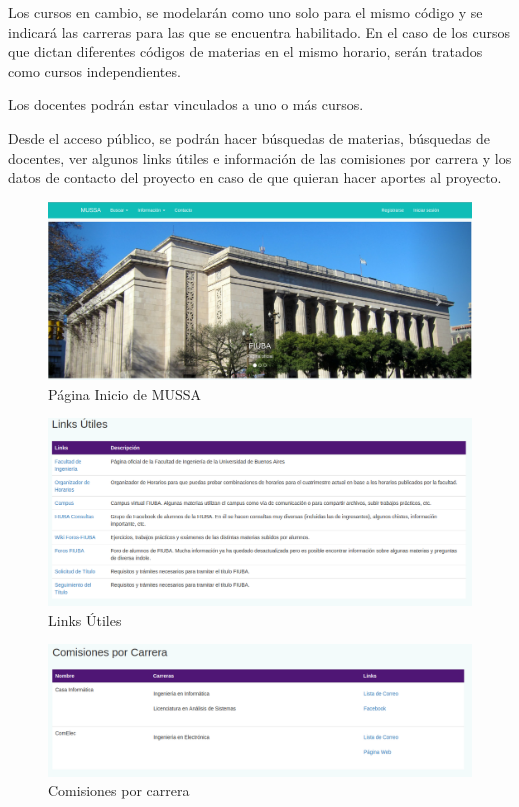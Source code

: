 \documentclass[a4paper]{article}
\begin{document}
Los cursos en cambio, se modelarán como uno solo para el mismo código y se indicará las carreras para las que se encuentra habilitado. En el caso de los cursos que dictan diferentes códigos de materias en el mismo horario, serán tratados como cursos independientes.

Los docentes podrán estar vinculados a uno o más cursos.\newline

Desde el acceso público, se podrán hacer búsquedas de materias, búsquedas de docentes, ver algunos links útiles e información de las comisiones por carrera y los datos de contacto del proyecto en caso de que quieran hacer aportes al proyecto.\newline

\begin{figure}[H]
\centering
\includegraphics[scale=0.25]{Imagenes/pagina_inicio.png}\par
\caption{Página Inicio de MUSSA}
\end{figure}

\begin{figure}[H]
\centering
\includegraphics[scale=0.3]{Imagenes/links_utiles.png}\par
\caption{Links Útiles}
\end{figure}

\begin{figure}[H]
\centering
\includegraphics[scale=0.3]{Imagenes/comisiones.png}\par
\caption{Comisiones por carrera}
\end{figure}
\end{document}
